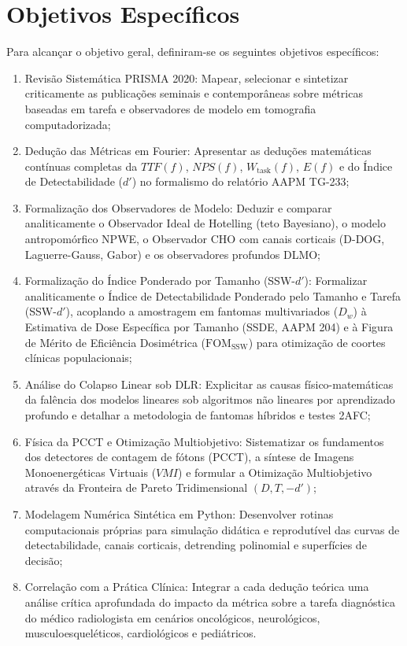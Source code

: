 \documentclass[
  12pt,
  a4paper,
  oneside
]{report}
\begin{document}
\section{Objetivos Específicos}
\label{chap:objetivos_especificos}
Para alcançar o objetivo geral, definiram-se os seguintes objetivos específicos:
\begin{enumerate}
  \item Revisão Sistemática PRISMA 2020: Mapear, selecionar e sintetizar criticamente as publicações seminais e contemporâneas sobre métricas baseadas em tarefa e observadores de modelo em tomografia computadorizada;
  \item Dedução das Métricas em Fourier: Apresentar as deduções matemáticas contínuas completas da $TTF(f)$, $NPS(f)$, $W_{\text{task}}(f)$, $E(f)$ e do Índice de Detectabilidade ($d'$) no formalismo do relatório AAPM TG-233;
  \item Formalização dos Observadores de Modelo: Deduzir e comparar analiticamente o Observador Ideal de Hotelling (teto Bayesiano), o modelo antropomórfico NPWE, o Observador CHO com canais corticais (D-DOG, Laguerre-Gauss, Gabor) e os observadores profundos DLMO;
  \item Formalização do Índice Ponderado por Tamanho (SSW-$d'$): Formalizar analiticamente o Índice de Detectabilidade Ponderado pelo Tamanho e Tarefa (SSW-$d'$), acoplando a amostragem em fantomas multivariados ($D_w$) à Estimativa de Dose Específica por Tamanho (SSDE, AAPM 204) e à Figura de Mérito de Eficiência Dosimétrica ($\text{FOM}_{\text{SSW}}$) para otimização de coortes clínicas populacionais;
  \item Análise do Colapso Linear sob DLR: Explicitar as causas físico-matemáticas da falência dos modelos lineares sob algoritmos não lineares por aprendizado profundo e detalhar a metodologia de fantomas híbridos e testes 2AFC;
  \item Física da PCCT e Otimização Multiobjetivo: Sistematizar os fundamentos dos detectores de contagem de fótons (PCCT), a síntese de Imagens Monoenergéticas Virtuais ($VMI$) e formular a Otimização Multiobjetivo através da Fronteira de Pareto Tridimensional $(D, T, -d')$;
  \item Modelagem Numérica Sintética em Python: Desenvolver rotinas computacionais próprias para simulação didática e reprodutível das curvas de detectabilidade, canais corticais, detrending polinomial e superfícies de decisão;
  \item Correlação com a Prática Clínica: Integrar a cada dedução teórica uma análise crítica aprofundada do impacto da métrica sobre a tarefa diagnóstica do médico radiologista em cenários oncológicos, neurológicos, musculoesqueléticos, cardiológicos e pediátricos.
\end{enumerate}
\end{document}
